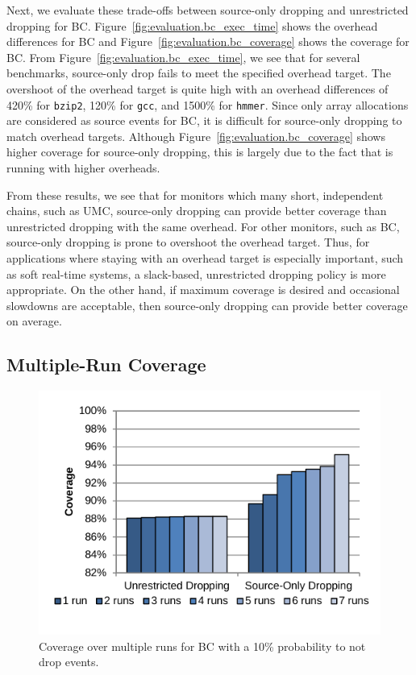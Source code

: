 Next, we evaluate these trade-offs between source-only dropping and unrestricted dropping for BC.
Figure~\ref{fig:evaluation.bc_exec_time} shows the overhead differences for BC
and Figure~\ref{fig:evaluation.bc_coverage} shows the coverage for BC.
From Figure~\ref{fig:evaluation.bc_exec_time}, we see that for several
benchmarks, source-only drop fails to meet the specified overhead target.
The overshoot of the overhead target is quite high with an overhead differences
of 420\% for {\tt bzip2}, 120\% for {\tt gcc}, and 1500\% for {\tt hmmer}.
Since only array allocations are considered as source events for BC, it is
difficult for source-only dropping to match overhead targets. Although
Figure~\ref{fig:evaluation.bc_coverage} shows higher coverage for
source-only dropping, this is largely due to the fact that is running with
higher overheads.

From these results, we see that for monitors which many short, independent
chains, such as UMC, source-only dropping can provide better coverage than
unrestricted dropping with the same overhead. For other monitors, such as BC,
source-only dropping is prone to overshoot the overhead target.
Thus, for applications where staying with an overhead target is especially
important, such as soft real-time systems, a slack-based, unrestricted dropping
policy is more appropriate. On the other hand, if maximum coverage is desired
and occasional slowdowns are acceptable, then source-only dropping can provide
better coverage on average.

\subsection{Multiple-Run Coverage}

\begin{figure}
  \begin{center}
    \includegraphics[width=\columnwidth, clip=true, trim=0 0.3in 0 0.1in]{figs/data_multirun_coverage.pdf}
    \vspace{-0.2in}
    \caption{Coverage over multiple runs for BC with a 10\% probability to not drop events.}
    \label{fig:evaluation.multirun}
    \vspace{-0.1in}
  \end{center}
\end{figure}

